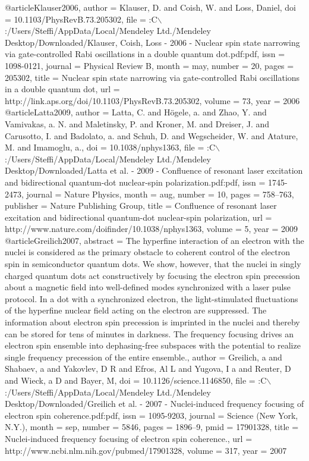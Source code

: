 @article{Klauser2006,
author = {Klauser, D. and Coish, W. and Loss, Daniel},
doi = {10.1103/PhysRevB.73.205302},
file = {:C$\backslash$:/Users/Steffi/AppData/Local/Mendeley Ltd./Mendeley Desktop/Downloaded/Klauser, Coish, Loss - 2006 - Nuclear spin state narrowing via gate-controlled Rabi oscillations in a double quantum dot.pdf:pdf},
issn = {1098-0121},
journal = {Physical Review B},
month = {may},
number = {20},
pages = {205302},
title = {{Nuclear spin state narrowing via gate-controlled Rabi oscillations in a double quantum dot}},
url = {http://link.aps.org/doi/10.1103/PhysRevB.73.205302},
volume = {73},
year = {2006}
}
@article{Latta2009,
author = {Latta, C. and H{\"{o}}gele, a. and Zhao, Y. and Vamivakas, a. N. and Maletinsky, P. and Kroner, M. and Dreiser, J. and Carusotto, I. and Badolato, a. and Schuh, D. and Wegscheider, W. and Atature, M. and Imamoglu, a.},
doi = {10.1038/nphys1363},
file = {:C$\backslash$:/Users/Steffi/AppData/Local/Mendeley Ltd./Mendeley Desktop/Downloaded/Latta et al. - 2009 - Confluence of resonant laser excitation and bidirectional quantum-dot nuclear-spin polarization.pdf:pdf},
issn = {1745-2473},
journal = {Nature Physics},
month = {aug},
number = {10},
pages = {758--763},
publisher = {Nature Publishing Group},
title = {{Confluence of resonant laser excitation and bidirectional quantum-dot nuclear-spin polarization}},
url = {http://www.nature.com/doifinder/10.1038/nphys1363},
volume = {5},
year = {2009}
}
@article{Greilich2007,
abstract = {The hyperfine interaction of an electron with the nuclei is considered as the primary obstacle to coherent control of the electron spin in semiconductor quantum dots. We show, however, that the nuclei in singly charged quantum dots act constructively by focusing the electron spin precession about a magnetic field into well-defined modes synchronized with a laser pulse protocol. In a dot with a synchronized electron, the light-stimulated fluctuations of the hyperfine nuclear field acting on the electron are suppressed. The information about electron spin precession is imprinted in the nuclei and thereby can be stored for tens of minutes in darkness. The frequency focusing drives an electron spin ensemble into dephasing-free subspaces with the potential to realize single frequency precession of the entire ensemble.},
author = {Greilich, a and Shabaev, a and Yakovlev, D R and Efros, Al L and Yugova, I a and Reuter, D and Wieck, a D and Bayer, M},
doi = {10.1126/science.1146850},
file = {:C$\backslash$:/Users/Steffi/AppData/Local/Mendeley Ltd./Mendeley Desktop/Downloaded/Greilich et al. - 2007 - Nuclei-induced frequency focusing of electron spin coherence.pdf:pdf},
issn = {1095-9203},
journal = {Science (New York, N.Y.)},
month = {sep},
number = {5846},
pages = {1896--9},
pmid = {17901328},
title = {{Nuclei-induced frequency focusing of electron spin coherence.}},
url = {http://www.ncbi.nlm.nih.gov/pubmed/17901328},
volume = {317},
year = {2007}
}
